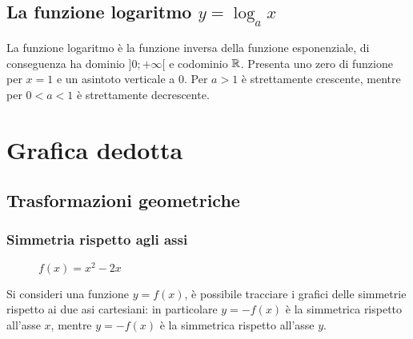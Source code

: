 \documentclass{article}     %
\begin{document}
    \subsection{La funzione logaritmo $y=\log_a x$}
        La funzione logaritmo è la funzione inversa della funzione esponenziale, di conseguenza ha dominio $]0;+\infty[$ e codominio $\mathbb{R}$. Presenta uno zero di funzione per $x=1$ e un asintoto verticale a $0$. Per $a>1$ è strettamente crescente, mentre per $0<a<1$ è strettamente decrescente. 

    \section{Grafica dedotta}
    \subsection{Trasformazioni geometriche}
    \subsubsection{Simmetria rispetto agli assi}
    \begin{wrapfigure}[3]{r}{0.3\textwidth}
        \centering
        \caption*{$f(x)=x^2-2x$}
    \end{wrapfigure}
        Si consideri una funzione $y=f(x)$, è possibile tracciare i grafici delle simmetrie rispetto ai due asi cartesiani: in particolare $y=-f(x)$ è la simmetrica rispetto all'asse $x$, mentre $y=-f(x)$ è la simmetrica rispetto all'asse $y$.
\end{document}
